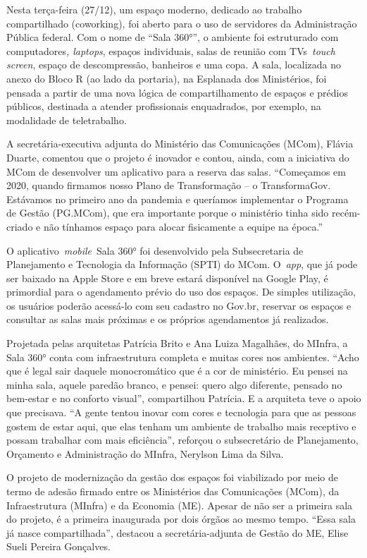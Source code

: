 \begin{itemize}
Nesta terça-feira (27/12), um espaço moderno, dedicado ao trabalho
compartilhado (coworking), foi aberto para o uso de servidores da
Administração Pública federal. Com o nome de
``Sala 360°'', o ambiente foi estruturado com computadores\emph{, laptops},
espaços individuais, salas de reunião com TVs~\emph{touch screen},
espaço de descompressão, banheiros e uma copa. A sala, localizada no
anexo do Bloco R (ao lado da portaria), na Esplanada dos Ministérios,
foi pensada a partir de uma nova lógica de compartilhamento de espaços e
prédios públicos, destinada a atender profissionais enquadrados, por
exemplo, na modalidade de teletrabalho.

A secretária-executiva adjunta do Ministério das Comunicações (MCom),
Flávia Duarte, comentou que o projeto é inovador e contou, ainda, com a
iniciativa do MCom de desenvolver um aplicativo para a reserva das
salas. ``Começamos em 2020, quando firmamos nosso Plano de Transformação
-- o TransformaGov. Estávamos no primeiro ano da pandemia e queríamos
implementar o Programa de Gestão (PG.MCom), que era importante porque o
ministério tinha sido recém-criado e não tínhamos espaço para alocar
fisicamente a equipe na época.''

O aplicativo~\emph{mobile}~Sala 360° foi desenvolvido pela Subsecretaria
de Planejamento e Tecnologia da Informação (SPTI) do MCom. O~\emph{app},
que já pode ser baixado na Apple Store e em breve estará disponível na
Google Play, é primordial para o agendamento prévio do uso dos espaços.
De simples utilização, os usuários poderão acessá-lo com seu cadastro no
Gov.br, reservar os espaços e consultar as salas mais próximas e os
próprios agendamentos já realizados.

Projetada pelas arquitetas Patrícia Brito e Ana Luiza Magalhães, do
MInfra, a Sala 360° conta com infraestrutura completa e muitas cores nos
ambientes. ``Acho que é legal sair daquele monocromático que é a cor de
ministério. Eu pensei na minha sala, aquele paredão branco, e pensei:
quero algo diferente, pensado no bem-estar e no conforto visual'',
compartilhou Patrícia. E a arquiteta teve o apoio que precisava. ``A
gente tentou inovar com cores e tecnologia para que as pessoas gostem de
estar aqui, que elas tenham um ambiente de trabalho mais receptivo e
possam trabalhar com mais eficiência'', reforçou o subsecretário de
Planejamento, Orçamento e Administração do MInfra, Nerylson Lima da
Silva.

O projeto de modernização da gestão dos espaços foi viabilizado por meio
de termo de adesão firmado entre os Ministérios das Comunicações (MCom),
da Infraestrutura (MInfra) e da Economia (ME). Apesar de não ser a
primeira sala do projeto, é a primeira inaugurada por dois órgãos ao
mesmo tempo. ``Essa sala já nasce compartilhada'', destacou a
secretária-adjunta de Gestão do ME, Elise Sueli Pereira Gonçalves.


\end{itemize}
